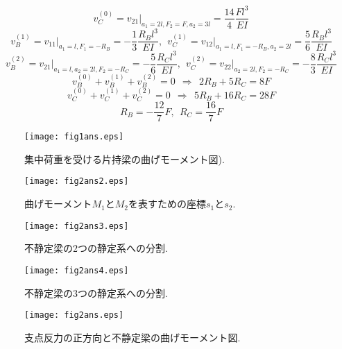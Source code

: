 \documentclass[10pt,a4j]{jarticle}
\begin{document}
\begin{enumerate}
\begin{equation}
		v_C^{(0)}=\left. v_{21}\right|_{a_1=2l, F_2=F, a_2=3l}= \frac{14}{4}\frac{Fl^3}{EI}
		\label{eqn:}
	\end{equation}
	\begin{equation}
		v_B^{(1)}=\left. v_{11}\right|_{a_1=l, F_1=-R_B}= -\frac{1}{3}\frac{R_Bl^3}{EI}, \ \ 
		v_C^{(1)}=\left. v_{12}\right|_{a_1=l, F_1=-R_B, a_2=2l}= \frac{5}{6}\frac{R_Bl^3}{EI}
		\label{eqn:}
	\end{equation}
	\begin{equation}
		v_B^{(2)}=\left. v_{21}\right|_{a_1=l, a_2=2l, F_2=-R_C}= -\frac{5}{6}\frac{R_Cl^3}{EI}, \ \ 
		v_C^{(2)}=\left. v_{22}\right|_{a_2=2l, F_2=-R_C}= -\frac{8}{3}\frac{R_Cl^3}{EI}
		\label{eqn:}
	\end{equation}
	\begin{equation}
		v_B^{(0)}+v_B^{(1)}+v_B^{(2)}=0 \ \ \Rightarrow \ \ 2R_B+5R_C=8F
		\label{eqn:}
	\end{equation}
	\begin{equation}
		v_C^{(0)}+v_C^{(1)}+v_C^{(2)}=0 \ \ \Rightarrow \ \ 5R_B+16R_C=28F
		\label{eqn:}
	\end{equation}
	\begin{equation}
		R_B=-\frac{12}{7}F, \ \ R_C=\frac{16}{7}F
		\label{eqn:}
	\end{equation}
\end{enumerate}
\begin{figure}[h]
	\begin{center}
	\texttt{[image: fig1ans.eps]} 
	\end{center}
	\caption{集中荷重を受ける片持梁の曲げモーメント図).}
	\label{fig:fig1}
\end{figure}
\begin{figure}[h]
	\begin{center}
	\texttt{[image: fig2ans2.eps]} 
	\end{center}
	\caption{曲げモーメント$M_1$と$M_2$を表すための座標$s_1$と$s_2$.}
	\label{fig:fig2}
\end{figure}
\begin{figure}[h]
	\begin{center}
	\texttt{[image: fig2ans3.eps]} 
	\end{center}
	\caption{不静定梁の2つの静定系への分割.}
	\label{fig:fig2_2}
\end{figure}
\begin{figure}[h]
	\begin{center}
	\texttt{[image: fig2ans4.eps]} 
	\end{center}
	\caption{不静定梁の3つの静定系への分割.}
	\label{fig:fig2_3}
\end{figure}
\begin{figure}
	\begin{center}
	\texttt{[image: fig2ans.eps]} 
	\end{center}
	\caption{支点反力の正方向と不静定梁の曲げモーメント図.}
	\label{fig:fig3}
\end{figure}
\end{document}
